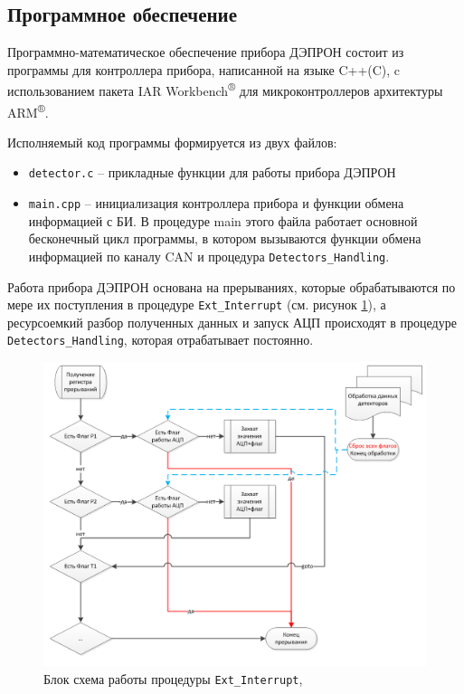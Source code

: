 \subsection{Программное обеспечение}

Программно-математическое обеспечение прибора ДЭПРОН состоит из программы для контроллера прибора, написанной на языке C++(C), c использованием пакета IAR  Workbench\textsuperscript{®} для микроконтроллеров архитектуры ARM\textsuperscript{®}. 


Исполняемый код программы формируется из двух файлов: 


\begin{itemize}
	\item 	\texttt{detector.c} -- прикладные функции для работы прибора ДЭПРОН
	
	
	\item \texttt{main.cpp} -- инициализация контроллера прибора и функции обмена информацией с БИ. В процедуре main этого файла работает основной бесконечный цикл программы, в котором вызываются функции обмена информацией по каналу CAN и процедура \texttt{Detectors\_Handling}.
	
	
\end{itemize}
Работа прибора ДЭПРОН основана на прерываниях, которые обрабатываются по мере их поступления в процедуре \texttt{Ext\_Interrupt} (см. рисунок \ref{fig:ext_interrupt}), а ресурсоемкий разбор полученных данных и запуск АЦП происходят в процедуре \texttt{Detectors\_Handling}, которая отрабатывает постоянно. 

\begin{figure}
\centering
\includegraphics[width=0.7\linewidth]{images/ext_interrupt}
\caption{Блок схема работы процедуры \texttt{Ext\_Interrupt}, }
\label{fig:ext_interrupt}
\end{figure}



